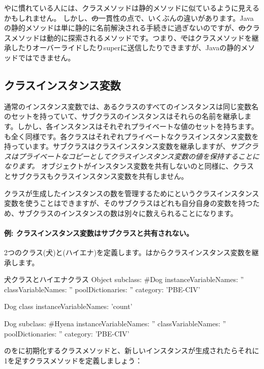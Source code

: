 \documentclass[a4paper,10pt,twoside]{book}
\begin{document}
やに慣れている人には、クラスメソッドは静的メソッドに似ているように見えるかもしれません。
しかし、\st の一貫性の点で、いくぶんの違いがあります。Javaの静的メソッドは単に静的に名前解決される手続きに過ぎないのですが、\st のクラスメソッドは動的に探索されるメソッドです。つまり、\st ではクラスメソッドを継承したりオーバーライドしたりsuperに送信したりできますが、Javaの静的メソッドではできません。

\subsection{クラスインスタンス変数}
通常のインスタンス変数では、あるクラスのすべてのインスタンスは同じ変数名のセットを持っていて、サブクラスのインスタンスはそれらの名前を継承します。しかし、各インスタンスはそれぞれプライベートな値のセットを持ちます。も全く同様です。各クラスはそれぞれプライベートなクラスインスタンス変数を持っています。サブクラスはクラスインスタンス変数を継承しますが、\emph{サブクラスはプライベートなコピーとしてクラスインスタンス変数の値を保持することになります。} オブジェクトがインスタンス変数を共有しないのと同様に、クラスとサブクラスもクラスインスタンス変数を共有しません。

クラスが生成したインスタンスの数を管理するためにというクラスインスタンス変数を使うことはできますが、そのサブクラスはどれも自分自身の変数を持つため、サブクラスのインスタンスの数は別々に数えられることになります。

\paragraph{例: クラスインスタンス変数はサブクラスと共有されない。}
2つのクラス(犬)と(ハイエナ)を定義します。はからクラスインスタンス変数を継承します。

\begin{classdef}[dog]{犬クラスとハイエナクラス}
Object subclass: #Dog
	instanceVariableNames: ''
	classVariableNames: ''
	poolDictionaries: ''
	category: 'PBE-CIV'

Dog class
	instanceVariableNames: 'count'

Dog subclass: #Hyena
	instanceVariableNames: ''
	classVariableNames: ''
	poolDictionaries: ''
	category: 'PBE-CIV'
\end{classdef}

のをに初期化するクラスメソッドと、新しいインスタンスが生成されたらそれに1を足すクラスメソッドを定義しましょう：
\end{document}
